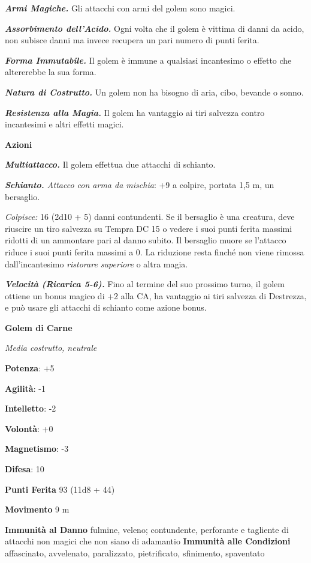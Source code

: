 \begin{multicols}{2}
\emph{\textbf{Armi Magiche.}} Gli attacchi con armi del golem sono
magici.

\emph{\textbf{Assorbimento dell'Acido.}} Ogni volta che il golem è
vittima di danni da acido, non subisce danni ma invece recupera un pari
numero di punti ferita.

\emph{\textbf{Forma Immutabile.}} Il golem è immune a qualsiasi
incantesimo o effetto che altererebbe la sua forma.

\emph{\textbf{Natura di Costrutto.}} Un golem non ha bisogno di aria,
cibo, bevande o sonno.

\emph{\textbf{Resistenza alla Magia.}} Il golem ha vantaggio ai tiri
salvezza contro incantesimi e altri effetti magici.

\textbf{Azioni}

\emph{\textbf{Multiattacco.}} Il golem effettua due attacchi di
schianto.

\emph{\textbf{Schianto.} Attacco con arma da mischia}: +9 a colpire,
portata 1,5 m, un bersaglio.

\emph{Colpisce:} 16 (2d10 + 5) danni contundenti. Se il bersaglio è una
creatura, deve riuscire un tiro salvezza su Tempra DC 15 o vedere
i suoi punti ferita massimi ridotti di un ammontare pari al danno
subito. Il bersaglio muore se l'attacco riduce i suoi punti ferita
massimi a 0. La riduzione resta finché non viene rimossa
dall'incantesimo \emph{ristorare superiore} o altra magia.

\emph{\textbf{Velocità (Ricarica 5-6).}} Fino al termine del suo
prossimo turno, il golem ottiene un bonus magico di +2 alla CA, ha
vantaggio ai tiri salvezza di Destrezza, e può usare gli attacchi di
schianto come azione bonus.

\textbf{Golem di Carne}

\emph{Media costrutto, neutrale}

\textbf{Potenza}: +5

\textbf{Agilità}: -1

\textbf{Intelletto}: -2

\textbf{Volontà}: +0

\textbf{Magnetismo}: -3

\textbf{Difesa}: 10

\textbf{Punti Ferita} 93 (11d8 + 44)

\textbf{Movimento} 9 m

\textbf{Immunità al Danno} fulmine, veleno; contundente, perforante e
tagliente di attacchi non magici che non siano di adamantio
\textbf{Immunità alle Condizioni} affascinato, avvelenato, paralizzato,
pietrificato, sfinimento, spaventato


\end{multicols}
